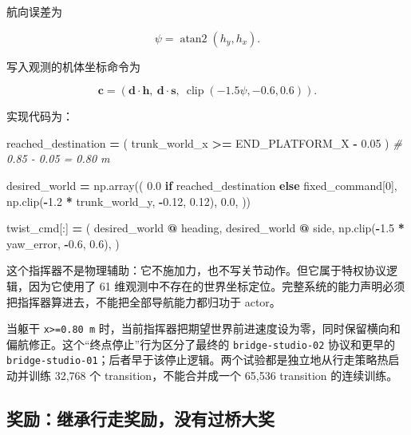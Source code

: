 \documentclass[
  chinese,
  11pt,
  letterpaper,
]{article}
\newenvironment{Shaded}{\begin{snugshade}}{\end{snugshade}}
\newcommand{\CommentTok}[1]{\textcolor[rgb]{0.56,0.35,0.01}{\textit{#1}}}
\newcommand{\ControlFlowTok}[1]{\textcolor[rgb]{0.13,0.29,0.53}{\textbf{#1}}}
\newcommand{\DecValTok}[1]{\textcolor[rgb]{0.00,0.00,0.81}{#1}}
\newcommand{\FloatTok}[1]{\textcolor[rgb]{0.00,0.00,0.81}{#1}}
\newcommand{\NormalTok}[1]{#1}
\newcommand{\OperatorTok}[1]{\textcolor[rgb]{0.81,0.36,0.00}{\textbf{#1}}}
\renewenvironment{Shaded}{\par\smallskip}{\par\smallskip}
\begin{document}
航向误差为

\[
\psi=\operatorname{atan2}(h_y,h_x).
\]

写入观测的机体坐标命令为

\[
\mathbf c=
\left(
\mathbf d\cdot\mathbf h,\
\mathbf d\cdot\mathbf s,\
\operatorname{clip}(-1.5\psi,-0.6,0.6)
\right).
\]

实现代码为：

\begin{Shaded}
\begin{Highlighting}[]
\NormalTok{reached\_destination }\OperatorTok{=}\NormalTok{ (}
\NormalTok{    trunk\_world\_x }\OperatorTok{\textgreater{}=}\NormalTok{ END\_PLATFORM\_X }\OperatorTok{{-}} \FloatTok{0.05}
\NormalTok{)  }\CommentTok{\# 0.85 {-} 0.05 = 0.80 m}

\NormalTok{desired\_world }\OperatorTok{=}\NormalTok{ np.array((}
    \FloatTok{0.0} \ControlFlowTok{if}\NormalTok{ reached\_destination }\ControlFlowTok{else}\NormalTok{ fixed\_command[}\DecValTok{0}\NormalTok{],}
\NormalTok{    np.clip(}\OperatorTok{{-}}\FloatTok{1.2} \OperatorTok{*}\NormalTok{ trunk\_world\_y, }\OperatorTok{{-}}\FloatTok{0.12}\NormalTok{, }\FloatTok{0.12}\NormalTok{),}
    \FloatTok{0.0}\NormalTok{,}
\NormalTok{))}

\NormalTok{twist\_cmd[:] }\OperatorTok{=}\NormalTok{ (}
\NormalTok{    desired\_world }\OperatorTok{@}\NormalTok{ heading,}
\NormalTok{    desired\_world }\OperatorTok{@}\NormalTok{ side,}
\NormalTok{    np.clip(}\OperatorTok{{-}}\FloatTok{1.5} \OperatorTok{*}\NormalTok{ yaw\_error, }\OperatorTok{{-}}\FloatTok{0.6}\NormalTok{, }\FloatTok{0.6}\NormalTok{),}
\NormalTok{)}
\end{Highlighting}
\end{Shaded}

这个指挥器不是物理辅助：它不施加力，也不写关节动作。但它属于特权协议逻辑，因为它使用了
61
维观测中不存在的世界坐标定位。完整系统的能力声明必须把指挥器算进去，不能把全部导航能力都归功于
actor。

当躯干 \texttt{x\textgreater{}=0.80\ m}
时，当前指挥器把期望世界前进速度设为零，同时保留横向和偏航修正。这个``终点停止''行为区分了最终的
\texttt{bridge-\allowbreak{}studio-\allowbreak{}02} 协议和更早的
\texttt{bridge-\allowbreak{}studio-\allowbreak{}01}；后者早于该停止逻辑。两个试验都是独立地从行走策略热启动并训练
32,768 个 transition，不能合并成一个 65,536 transition 的连续训练。

\subsection{奖励：继承行走奖励，没有过桥大奖}\label{ux5956ux52b1ux7ee7ux627fux884cux8d70ux5956ux52b1ux6ca1ux6709ux8fc7ux6865ux5927ux5956}
\end{document}
